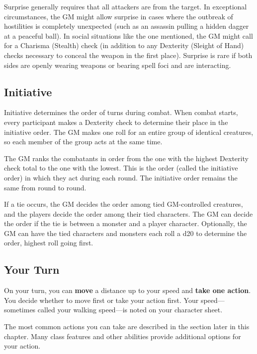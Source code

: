 Surprise generally requires that all attackers are  from the target. In exceptional circumstances, the GM might allow surprise in cases where the outbreak of hostilities is completely unexpected (such as an assassin pulling a hidden dagger at a peaceful ball). In social situations like the one mentioned, the GM might call for a Charisma (Stealth) check (in addition to any Dexterity (Sleight of Hand) checks necessary to conceal the weapon in the first place). Surprise is rare if both sides are openly wearing weapons or bearing spell foci and are interacting.

\subsection{Initiative}

Initiative determines the order of turns during combat. When combat starts, every participant makes a Dexterity check to determine their place in the initiative order. The GM makes one roll for an entire group of identical creatures, so each member of the group acts at the same time.

The GM ranks the combatants in order from the one with the highest Dexterity check total to the one with the lowest. This is the order (called the initiative order) in which they act during each round. The initiative order remains the same from round to round.

If a tie occurs, the GM decides the order among tied GM-controlled creatures, and the players decide the order among their tied characters. The GM can decide the order if the tie is between a monster and a player character. Optionally, the GM can have the tied characters and monsters each roll a d20 to determine the order, highest roll going first.

\subsection{Your Turn}

On your turn, you can \textbf{move} a distance up to your speed and \textbf{take one action}. You decide whether to move first or take your action first. Your speed— sometimes called your walking speed—is noted on your character sheet.

The most common actions you can take are described in the  section later in this chapter. Many class features and other abilities provide additional options for your action.

